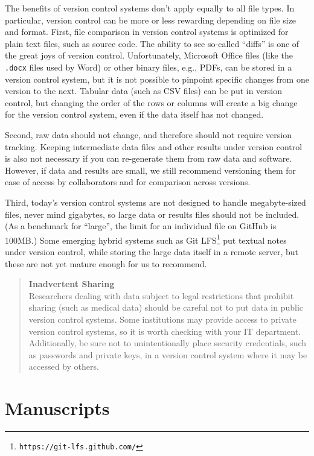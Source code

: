 \documentclass[10pt,letterpaper]{article}
\newcommand{\withurl}[2]{{#1}\footnote{{\texttt{#2}}}}
\newcommand{\practicesection}[2]{\section{#1}\label{#2}}
\begin{document}
The benefits of version control systems don't apply equally to all
file types.  In particular, version control can be more or less
rewarding depending on file size and format.  First, file comparison
in version control systems is optimized for plain text files, such as
source code. The ability to see so-called ``diffs'' is one of the
great joys of version control. Unfortunately, Microsoft
Office files (like the \texttt{.docx} files used by Word) or other
binary files, e.g., PDFs, can be stored in a version control system,
but it is not possible to pinpoint specific changes from one version
to the next.  Tabular data (such as CSV files) can be put in version
control, but changing the order of the rows or columns will create a
big change for the version control system, even if the data itself has
not changed.

Second, raw data should not change, and therefore should not require
version tracking.  Keeping intermediate data files and other results
under version control is also not necessary if you can re-generate
them from raw data and software. However, if data and results are
small, we still recommend versioning them for ease of access by
collaborators and for comparison across versions.

Third, today's version control systems are not designed to handle
megabyte-sized files, never mind gigabytes, so large data or results
files should not be included.  (As a benchmark for ``large'', the
limit for an individual file on GitHub is 100MB.)  Some emerging
hybrid systems such as \withurl{Git LFS}{https://git-lfs.github.com/}
put textual notes under version control, while storing the large data
itself in a remote server, but these are not yet mature enough for us
to recommend.

\begin{quote}
  \noindent \textbf{Inadvertent Sharing}
  \\
  Researchers dealing with data subject to legal restrictions that
  prohibit sharing (such as medical data) should be careful not to put
  data in public version control systems. Some institutions may
  provide access to private version control systems, so it is worth
  checking with your IT department.
  \\
  Additionally, be sure not to unintentionally place security
  credentials, such as passwords and private keys, in a version
  control system where it may be accessed by others.
\end{quote}

\practicesection{Manuscripts}{sec:manuscripts}
\end{document}
